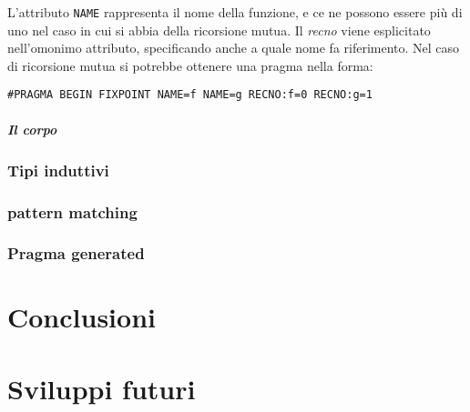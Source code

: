 \documentclass[12pt,a4paper]{report}
\begin{document}
L'attributo \texttt{NAME} rappresenta il nome della funzione, e ce ne possono
essere più di uno nel caso in cui si abbia della ricorsione mutua. Il \textit{recno}
viene esplicitato nell'omonimo attributo, specificando anche a quale nome fa
riferimento. Nel caso di ricorsione mutua si potrebbe ottenere una pragma nella
forma:
\begin{center}
\texttt{\#PRAGMA BEGIN FIXPOINT NAME=f NAME=g RECNO:f=0 RECNO:g=1}
\end{center}

\paragraph{Il corpo}

\subsection{Tipi induttivi}

\subsection{pattern matching}

\subsection{Pragma generated}

\chapter{Conclusioni}

\chapter{Sviluppi futuri}


\end{document}
